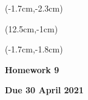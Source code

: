 \documentclass[12pt, oneside]{article}
\begin{document}
\begin{textblock*}{4cm}(-1.7cm,-2.3cm)
\end{textblock*}

\begin{textblock*}{8cm}(12.5cm,-1cm)
\end{textblock*}
\begin{textblock*}{13.5cm}(-1.7cm,-1.8cm)
\end{textblock*}

\vspace{1cm}

\begin{center}
\textbf{\Large Homework 9}

\textbf{Due 30 April 2021}
\end{center}
\end{document}
